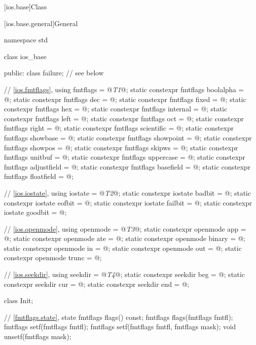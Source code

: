 [ios.base]{Class }

[ios.base.general]{General}
%
\begin{codeblock}
namespace std {
  class ios_base {
  public:
    class failure;              // see below

    // \ref{ios.fmtflags}, 
    using fmtflags = @\textit{T1}@;
    static constexpr fmtflags boolalpha = @\unspec@;
    static constexpr fmtflags dec = @\unspec@;
    static constexpr fmtflags fixed = @\unspec@;
    static constexpr fmtflags hex = @\unspec@;
    static constexpr fmtflags internal = @\unspec@;
    static constexpr fmtflags left = @\unspec@;
    static constexpr fmtflags oct = @\unspec@;
    static constexpr fmtflags right = @\unspec@;
    static constexpr fmtflags scientific = @\unspec@;
    static constexpr fmtflags showbase = @\unspec@;
    static constexpr fmtflags showpoint = @\unspec@;
    static constexpr fmtflags showpos = @\unspec@;
    static constexpr fmtflags skipws = @\unspec@;
    static constexpr fmtflags unitbuf = @\unspec@;
    static constexpr fmtflags uppercase = @\unspec@;
    static constexpr fmtflags adjustfield = @\seebelow@;
    static constexpr fmtflags basefield = @\seebelow@;
    static constexpr fmtflags floatfield = @\seebelow@;

    // \ref{ios.iostate}, 
    using iostate = @\textit{T2}@;
    static constexpr iostate badbit = @\unspec@;
    static constexpr iostate eofbit = @\unspec@;
    static constexpr iostate failbit = @\unspec@;
    static constexpr iostate goodbit = @\seebelow@;

    // \ref{ios.openmode}, 
    using openmode = @\textit{T3}@;
    static constexpr openmode app = @\unspec@;
    static constexpr openmode ate = @\unspec@;
    static constexpr openmode binary = @\unspec@;
    static constexpr openmode in = @\unspec@;
    static constexpr openmode out = @\unspec@;
    static constexpr openmode trunc = @\unspec@;

    // \ref{ios.seekdir}, 
    using seekdir = @\textit{T4}@;
    static constexpr seekdir beg = @\unspec@;
    static constexpr seekdir cur = @\unspec@;
    static constexpr seekdir end = @\unspec@;

    class Init;

    // \ref{fmtflags.state},  state
    fmtflags flags() const;
    fmtflags flags(fmtflags fmtfl);
    fmtflags setf(fmtflags fmtfl);
    fmtflags setf(fmtflags fmtfl, fmtflags mask);
    void unsetf(fmtflags mask);

}}
\end{codeblock}
